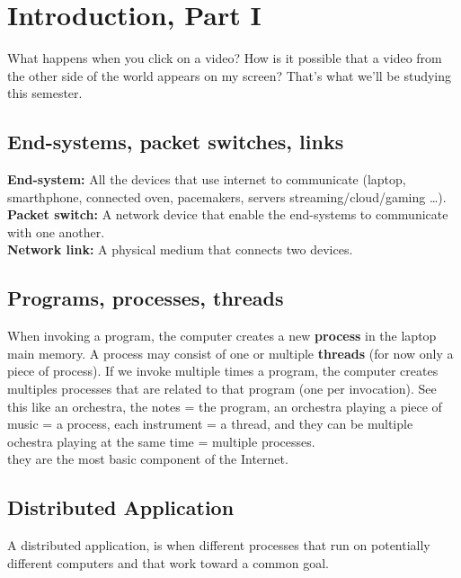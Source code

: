 

\section{Introduction, Part I}
What happens when you click on a video? How is it possible that a video from the other side of the world appears on my screen? That's what we'll be studying this semester.
\subsection{End-systems, packet switches, links}%
\label{sub:End-systems, packet switches, links}

\textbf{End-system:} All the devices that use internet to communicate (laptop, smarthphone, connected oven, pacemakers, servers streaming/cloud/gaming \ldots).
\\
\textbf{Packet switch:} A network device that enable the end-systems to communicate with one another.
\\
\textbf{Network link:} A physical medium that connects two devices. 

\subsection{Programs, processes, threads}%
\label{sub:Programs, processes, threads}

When invoking a program, the computer creates a new \textbf{process} in the laptop main memory. A process may consist of one or multiple \textbf{threads} (for now only a piece of process). If we invoke multiple times a program, the computer creates multiples processes that are related to that program (one per invocation). See this like an orchestra, the notes = the program, an orchestra playing a piece of music = a process, each instrument = a thread, and they can be multiple ochestra playing at the same time = multiple processes.
\\ \textrightarrow they are the most basic component of the Internet.

\subsection{Distributed Application}%
\label{sub:Distributed Application}
A distributed application, is when different processes that run on potentially different computers and that work toward a common goal.  

